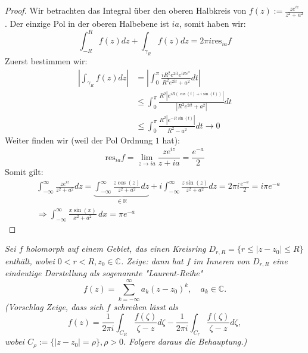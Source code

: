 \documentclass[11pt]{article}
\newcommand{\R}{\mathbb{R}}
\newcommand{\C}{\mathbb{C}}
\newcommand{\res}{\text{res}}
\newenvironment{problem}[2][Beispiel]{
    \begin{trivlist}
        \item[\hskip \labelsep {\bfseries #1}\hskip \labelsep {\bfseries #2.}] \itshape}{
    \end{trivlist}\normalshape
}
\begin{document}
    \begin{proof}
        Wir betrachten das Integral über den oberen Halbkreis von $f(z) := \frac{ze^{iz}}{z^2 +a^2}$.
        Der einzige Pol in der oberen Halbebene ist $ia$, somit haben wir:
        $$\int_{-R}^{R} f(z)dz +\int_{\gamma_R} f(z)dz=2\pi i\res_{ia}f$$
        Zuerst bestimmen wir:
        $$\begin{aligned}
              \left|\int_{\gamma_R} f(z)dz\right| &=
              \left|\int_{0}^{\pi}\frac{iR^2e^{2it}e^{iRe^{it}}}{R^2 e^{2it}+a^2}dt\right|\\
              &\leq \int_{0}^{\pi}\frac{R^2|e^{iR(\cos(t)+i\sin(t))}|}{|R^2 e^{2it}+a^2|}dt\\
              &\leq \int_{0}^{\pi}\frac{R^2|e^{-R\sin(t)}|}{R^2-a^2}dt\to 0
        \end{aligned}$$
        Weiter finden wir (weil der Pol Ordnung $1$ hat):
        $$\res_{ia}f = \lim_{z\to ia}\frac{ze^{iz}}{z+ia} = \frac{e^{-a}}{2}$$
        Somit gilt:
        $$\begin{aligned}
              &\int_{-\infty}^{\infty} \frac{ze^{iz}}{z^2 +a^2}dz =
              \underbrace{\int_{-\infty}^{\infty} \frac{z\cos(z)}{z^2 +a^2}dz}_{\in \R}+
              i\int_{-\infty}^{\infty} \frac{z\sin(z)}{z^2 +a^2}dz
              = 2\pi i\frac{e^{-a}}{2}=i\pi e^{-a}\\&
              \Rightarrow \int_{-\infty}^\infty \frac{x\sin(x)}{x^2+a^2}\,dx = \pi e^{-a}
        \end{aligned}$$
    \end{proof}

    \begin{problem}{5}
        Sei $f$ holomorph auf einem Gebiet, das einen Kreisring $D_{r,R}=\{r\leq |z-z_0|\leq R\}$ enthält,
        wobei $0<r<R, z_0\in\C$. Zeige: dann hat $f$ im Inneren von $D_{r,R}$ eine eindeutige Darstellung als
        sogenannte "Laurent-Reihe"
        $$f(z)=\sum_{k=-\infty}^\infty a_k(z-z_0)^k, \quad a_k\in\C.$$
        (Vorschlag Zeige, dass sich $f$ schreiben lässt als
        $$f(z)=\frac{1}{2\pi i}\int_{C_R}\frac{f(\zeta)}{\zeta -z}d\zeta-\frac{1}{2\pi i}\int_{C_r}
        \frac{f(\zeta)}{\zeta -z}d\zeta,$$
        wobei $C_{\rho}:= \{|z-z_0|=\rho\},\rho>0$. Folgere daraus die Behauptung.)
    \end{problem}
\end{document}
